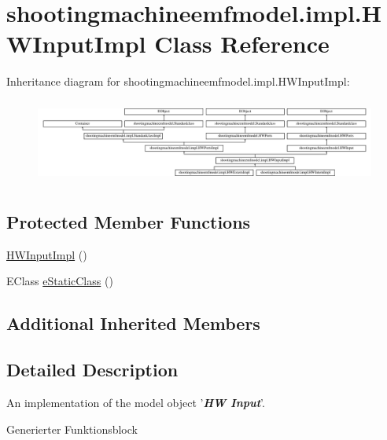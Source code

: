 \hypertarget{classshootingmachineemfmodel_1_1impl_1_1_h_w_input_impl}{\section{shootingmachineemfmodel.\-impl.\-H\-W\-Input\-Impl Class Reference}
\label{classshootingmachineemfmodel_1_1impl_1_1_h_w_input_impl}
}
Inheritance diagram for shootingmachineemfmodel.\-impl.\-H\-W\-Input\-Impl\-:\begin{figure}[H]
\begin{center}
\leavevmode
\includegraphics[height=2.809365cm]{classshootingmachineemfmodel_1_1impl_1_1_h_w_input_impl}
\end{center}
\end{figure}
\subsection*{Protected Member Functions}
\begin{DoxyCompactItemize}
\item 
\hyperlink{classshootingmachineemfmodel_1_1impl_1_1_h_w_input_impl_a91ecbdfb75d3235cd17688153a773e21}{H\-W\-Input\-Impl} ()
\item 
E\-Class \hyperlink{classshootingmachineemfmodel_1_1impl_1_1_h_w_input_impl_acccd2fd62f7d2d9772512c67e92a706d}{e\-Static\-Class} ()
\end{DoxyCompactItemize}
\subsection*{Additional Inherited Members}


\subsection{Detailed Description}
An implementation of the model object '{\itshape {\bfseries H\-W Input}}'.

Generierter Funktionsblock 


